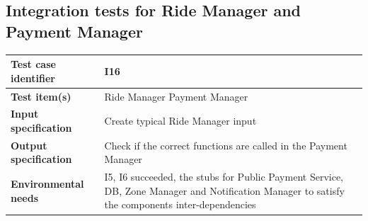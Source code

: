 \documentclass[a4paper,11pt]{report} %
\begin{document}
		\subsection{Integration tests for Ride Manager and Payment Manager}
			\begin{minipage}{\linewidth}
			\end{minipage}		
		\begin{center}
			\renewcommand{\arraystretch}{1.2}
			\setlength{\tabcolsep}{24pt}
			\begin{tabular}{ l  p{9cm}}\hline
				\textbf{Test case identifier} & I16\\\hline
				\textbf{Test item(s)} & Ride Manager \textrightarrow Payment Manager\\\hline
				\textbf{Input specification} & Create typical Ride Manager input \\\hline
				\textbf{Output specification} & Check if the correct functions are called in the Payment Manager\\\hline
				\textbf{Environmental needs} & I5, I6 succeeded, the stubs for Public Payment Service, DB, Zone Manager and Notification Manager to satisfy the components inter-dependencies\\\hline
			\end{tabular}
		\end{center}
\end{document}
